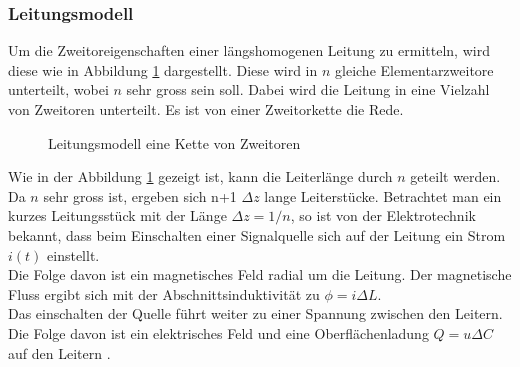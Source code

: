 \subsubsection{Leitungsmodell}
Um die Zweitoreigenschaften einer längshomogenen Leitung zu ermitteln, wird diese wie in
Abbildung \ref{fig:LeitungsmodellZweitorKette} dargestellt. Diese wird in $n$ gleiche Elementarzweitore unterteilt, wobei $n$ sehr gross sein soll. Dabei wird die Leitung in eine Vielzahl von Zweitoren unterteilt. Es ist von einer Zweitorkette die Rede.
\begin{figure}[h]
	\begin{center}
	\end{center}
\caption{Leitungsmodell eine Kette von Zweitoren}
\label{fig:LeitungsmodellZweitorKette}
\end{figure}
Wie in der Abbildung \ref{fig:LeitungsmodellZweitorKette} gezeigt ist, kann die Leiterlänge durch $n$ geteilt werden. Da $n$ sehr gross ist, ergeben sich n+1 $\Delta z$ lange Leiterstücke. Betrachtet man ein kurzes Leitungsstück mit der Länge $\Delta z = 1/n$, so ist von der Elektrotechnik  bekannt, dass beim Einschalten einer Signalquelle sich auf der Leitung ein Strom $i(t)$ einstellt. \\Die Folge davon ist ein magnetisches Feld radial um die Leitung. Der magnetische Fluss ergibt sich mit der Abschnittsinduktivität zu $\phi = i  \Delta L$. \\
Das einschalten der Quelle führt weiter zu einer  Spannung zwischen den Leitern. Die Folge davon ist ein elektrisches Feld und eine Oberflächenladung $Q = u  \Delta C$ auf den Leitern \cite{Emant}.

